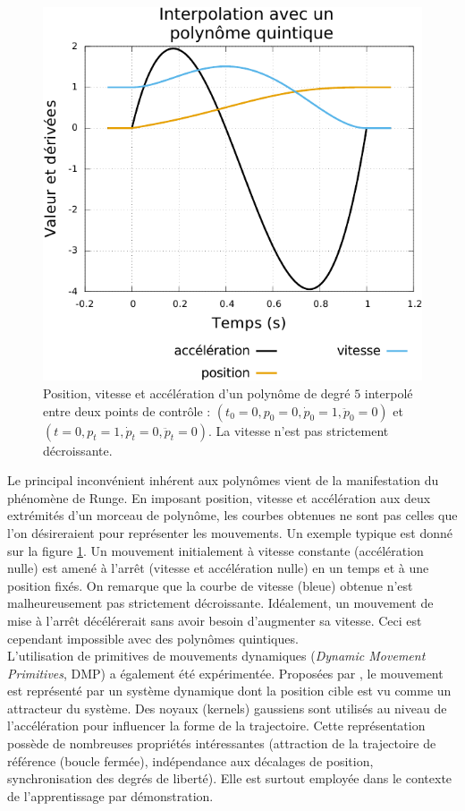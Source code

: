 \begin{figure}[htb]
    \begin{center}
        \includegraphics[type=pdf,ext=.pdf,read=.pdf,width=0.6\linewidth]{../plot/quintic_runge}
        \caption{\label{fig:quintic_runge}
            Position, vitesse et accélération d'un polynôme de degré $5$ 
            interpolé entre deux points
            de contrôle : $(t_0=0,p_0=0,\dot{p}_0=1,\ddot{p}_0=0)$ et 
            $(t=0,p_t=1,\dot{p}_t=0,\ddot{p}_t=0)$.
            La vitesse n'est pas strictement décroissante.
        }
    \end{center}
\end{figure}

Le principal inconvénient inhérent aux polynômes
vient de la manifestation du phénomène de Runge.
En imposant position, vitesse et accélération aux deux
extrémités d'un morceau de polynôme, les courbes obtenues
ne sont pas celles que l'on désireraient pour représenter les mouvements.
Un exemple typique est donné sur la figure \ref{fig:quintic_runge}.
Un mouvement initialement à vitesse constante (accélération nulle)
est amené à l'arrêt (vitesse et accélération nulle) en un
temps et à une position fixés.
On remarque que la courbe de vitesse (bleue) obtenue n'est malheureusement 
pas strictement décroissante. 
Idéalement, un mouvement de mise à l'arrêt décélérerait sans avoir besoin
d'augmenter sa vitesse. 
Ceci est cependant impossible avec des polynômes quintiques.\\

L'utilisation de primitives de mouvements dynamiques 
(\textit{Dynamic Movement Primitives}, DMP) a également été expérimentée.
Proposées par \cite{schaal_learning_2005}, le mouvement est représenté
par un système dynamique dont la position cible est vu comme 
un attracteur du système.
Des noyaux (kernels) gaussiens sont utilisés au niveau de 
l'accélération pour influencer la forme de la trajectoire.
Cette représentation possède de nombreuses propriétés intéressantes
(attraction de la trajectoire de référence (boucle fermée), 
indépendance aux décalages de position, synchronisation des degrés de liberté).
Elle est surtout employée dans le contexte de l'apprentissage par démonstration.

